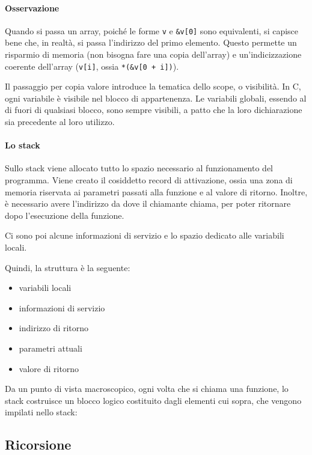 \paragraph*{Osservazione}
Quando si passa un array, poiché le forme \verb|v| e \verb|&v[0]| sono equivalenti, si capisce bene che, in realtà, si passa l'indirizzo del primo elemento. Questo permette un risparmio di memoria (non bisogna fare una copia dell'array) e un'indicizzazione coerente dell'array (\verb|v[i]|, ossia \verb|*(&v[0 + i])|).

Il passaggio per copia valore introduce la tematica dello scope, o visibilità. In C, ogni variabile è visibile nel blocco di appartenenza. Le variabili globali, essendo al di fuori di qualsiasi blocco, sono sempre visibili, a patto che la loro dichiarazione sia precedente al loro utilizzo.

\paragraph*{Lo stack}

Sullo stack viene allocato tutto lo spazio necessario al funzionamento del programma.
Viene creato il cosiddetto record di attivazione, ossia una zona di memoria riservata ai parametri passati alla funzione e al valore di ritorno.
Inoltre, è necessario avere l'indirizzo da dove il chiamante chiama, per poter ritornare dopo l'esecuzione della funzione.

Ci sono poi alcune informazioni di servizio e lo spazio dedicato alle variabili locali.

Quindi, la struttura è la seguente:
\begin{itemize}
  \item variabili locali
  \item informazioni di servizio
  \item indirizzo di ritorno
  \item parametri attuali
  \item valore di ritorno
\end{itemize}

Da un punto di vista macroscopico, ogni volta che si chiama una funzione, lo stack costruisce un blocco logico costituito dagli elementi cui sopra, che vengono impilati nello stack:


\subsection{Ricorsione}

